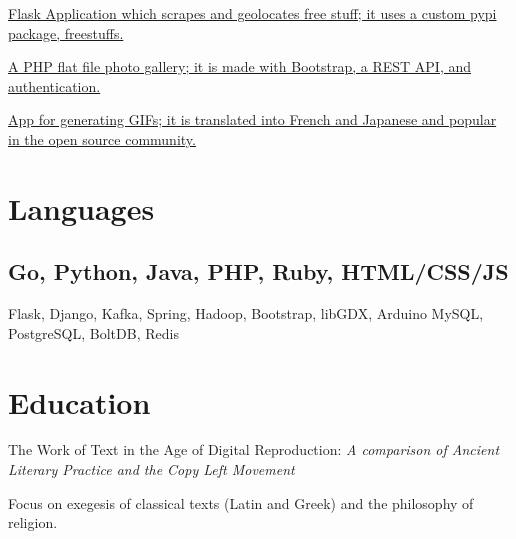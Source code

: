 \documentclass[]{deedy-resume-openfont}
\begin{document}
\href{http://thetreasure.stream}{ Flask Application which scrapes and geolocates free stuff; it uses a custom pypi package, freestuffs.}
\sectionsep

\href{https://github.com/fenimore/wink}{A PHP flat file photo gallery; it is made with Bootstrap, a REST API, and authentication.}
\sectionsep

\href{https://github.com/fenimore/fissure-android}{App for generating GIFs; it is translated into French and Japanese and popular in the open source community.}

\section{Languages}
\subsection{Go, Python, Java, PHP, Ruby, HTML/CSS/JS}
Flask, Django, Kafka, Spring, Hadoop, Bootstrap, libGDX, Arduino \textbullet{} MySQL, PostgreSQL, BoltDB, Redis


\section{Education}
The Work of Text in the Age of Digital Reproduction:
\textit{A comparison of Ancient Literary Practice and the Copy Left Movement}

Focus on exegesis of classical texts (Latin and Greek) and the philosophy of religion.
\sectionsep
\end{document}
